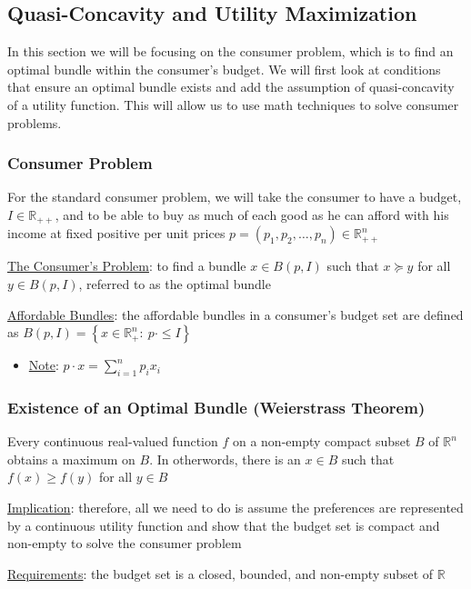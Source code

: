 \documentclass{article}
\begin{document}
\newpage

\vspace{2.5mm}
\subsection{Quasi-Concavity and Utility Maximization}
In this section we will be focusing on the consumer problem, which is to find an optimal bundle within the consumer's budget. We will first look at conditions that ensure an optimal bundle exists and add the assumption of quasi-concavity of a utility function. This will allow us to use math techniques to solve consumer problems. \par
\vspace{6mm}
\subsubsection{Consumer Problem}
For the standard consumer problem, we will take the consumer to have a budget, $I \in \mathbb{R}_{++}$, and to be able to buy as much of each good as he can afford with his income at fixed positive per unit prices $p = (p_{1}, p_{2}, \dots, p_{n}) \in \mathbb{R}_{++}^{n}$ \par \vspace{0.3em}
\underline{The Consumer's Problem}: to find a bundle $x \in B(p, I)$ such that $x \succeq y$ for all $y \in B(p, I)$, referred to as the optimal bundle \par
\underline{Affordable Bundles}: the affordable bundles in a consumer's budget set are defined as $B(p, I) = \left\{ x \in \mathbb{R}_{+}^{n}: \ p \cdot \leq I \right\}$
\begin{itemize}
  \item  \underline{Note}: $p \cdot x = \sum_{i=1}^{n}p_{i}x_{i}$
\end{itemize}
\par
\vspace{6mm}
\subsubsection{Existence of an Optimal Bundle (Weierstrass Theorem)}
Every continuous real-valued function $f$ on a non-empty compact subset $B$ of $\mathbb{R}^{n}$ obtains a maximum on $B$. In otherwords, there is an $x \in B$ such that $f(x) \geq f(y)$ for all $y \in B$ \par \vspace{0.3em}
  \underline{Implication}: therefore, all we need to do is assume the preferences are represented by a continuous utility function and show that the budget set is compact and non-empty to solve the consumer problem \par
  \underline{Requirements}: the budget set is a closed, bounded, and non-empty subset of $\mathbb{R}$ \par
\vspace{6mm}
\end{document}
